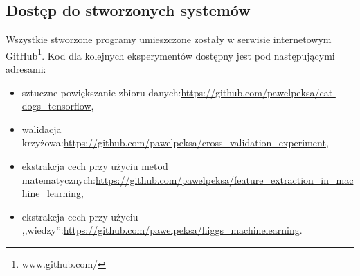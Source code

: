 \renewcommand{\appendixtocname}{Dodatki}
\renewcommand{\appendixpagename}{Dodatki}

\clearpage

\begin{appendices}
\section{Dostęp do stworzonych systemów}
Wszystkie stworzone programy umieszczone zostały w serwisie internetowym GitHub\footnote{www.github.com/}. Kod dla kolejnych eksperymentów dostępny jest pod następującymi adresami:
\begin{itemize}
\item sztuczne powiększanie zbioru danych:\url{https://github.com/pawelpeksa/cat-dogs_tensorflow},
\item walidacja krzyżowa:\url{https://github.com/pawelpeksa/cross_validation_experiment},
\item ekstrakcja cech przy użyciu metod matematycznych:\url{https://github.com/pawelpeksa/feature_extraction_in_machine_learning},
\item ekstrakcja cech przy użyciu ,,wiedzy'':\url{https://github.com/pawelpeksa/higgs_machinelearning}.
\end{itemize}

\end{appendices}
